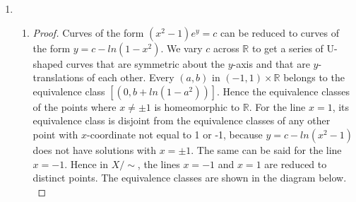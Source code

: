 \documentclass{article}
\begin{document}
\begin{enumerate}
\begin{enumerate}
\begin{proof}
          Map $f$ is clearly bijective, with inverse $f^{-1}$ defined by
          $f^{-1}(r)=[(r,0)]$. It remains to show that $f$ and $f^{-1}$ are
          continuous. We first show that $f$ is continuous. Given an open
          interval $(r_1,r_2)\in R$ (or $(0,r_2)\in R$), we need to show
          that its pre-image $\{[(r,0)]:r_1<r<r_2\}$ (or $\{[(r,0)]:0\leq
          r<r_2\}$) is open in $R$. This is the same as showing that
          $\{(x,y):r_1<x^2+y^2<r_2\}$ (or $\{(x,y):x^2+y^2<r_2\}$) is open
          in $\mathbb{R}^2$, which is true. \\

          Finally, we show that $f^{-1}$ is continuous, which is equivalent
          to showing that $f$ sends open sets to open sets. Let
          $\bar{U}=\{[(r_i,0)]:i\in I\}$ be an open set in
          $\mathbb{R}^2/\sim$. Then $f(U)=\{|r_i|:i\in I\}$. Let $r\in f(U)$.
          We want to show that there is an open interval
          $B_\epsilon(r)\subset R$ that is contained in $f(U)$.
          Since $\bar{U}$ is open in $\mathbb{R}^2/\sim$,
          $U=\{(x,y):x^2+y^2\in\{r_i^2:i\in I\}\}$ must be open in
          $\mathbb{R}^2$. Also, $(r,0)\in U$, so there must be a ball
          $B_\epsilon((r,0))\subset\mathbb{R}^2$ containing $(r,0)$ in $U$.
          The image of this ball under $f$ is an open interval
          $B_\epsilon(r)\subset\mathbb{R}$ that is contained in $f(U)$ and
          that contains $r$, which is the interval we are looking for.
        \end{proof}
    \end{enumerate}
  \item
    \begin{enumerate}
      \item
        \begin{proof}
          Curves of the form $(x^2-1)e^y=c$ can be reduced to curves of the
          form $y=c-ln(1-x^2)$. We vary $c$ across $\mathbb{R}$ to get a
          series of U-shaped curves that are symmetric about the $y$-axis
          and that are $y$-translations of each other. Every $(a,b)$ in
          $(-1,1)\times\mathbb{R}$ belongs to the equivalence class
          $[(0,b+ln(1-a^2))]$. Hence the equivalence classes of the points
          where $x\neq\pm1$ is homeomorphic to $\mathbb{R}$. For the line
          $x=1$, its equivalence class is disjoint from the equivalence
          classes of any other point with $x$-coordinate not equal to 1 or
          -1, because $y=c-ln(x^2-1)$ does not have solutions with $x=\pm
          1$. The same can be said for the line $x=-1$. Hence in $X/\sim$,
          the lines $x=-1$ and $x=1$ are reduced to distinct points. The
          equivalence classes are shown in the diagram below. \\


\end{proof}
\end{enumerate}
\end{enumerate}
\end{document}
